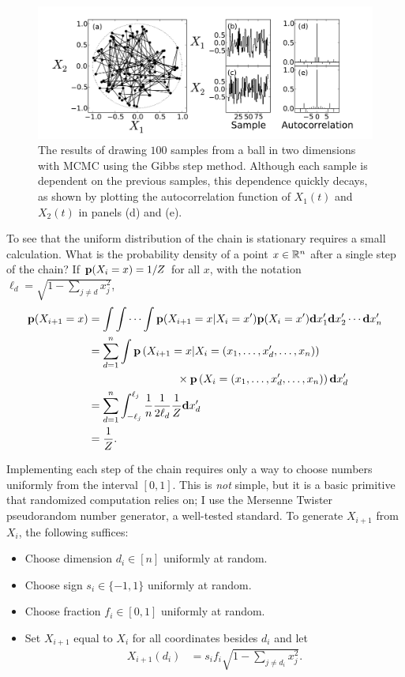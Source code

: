 \begin{figure}[ht]
\begin{center}
\includegraphics[width=\textwidth]{gibbs-ball.pdf}
\caption[The results of drawing $100$ samples from a ball in two
  dimensions with MCMC using the Gibbs step method.]{The 
  results of drawing $100$ samples from a ball in two
  dimensions with MCMC using the Gibbs step method.  Although each
  sample is dependent on the previous samples, this dependence quickly
  decays, as shown by plotting the autocorrelation function of
  $X_1(t)$ and $X_2(t)$ in panels (d) and (e).}
\label{gibbs-ball}
\end{center}
\end{figure}


To see that the uniform distribution of the chain is stationary
requires a small calculation.  What is the probability density of a
point $x \in \mathbb{R}^n$ after a single step of the chain?  If
$\mathbf{p}(X_i=x) = 1/Z$ for all $x$, with the notation
$\ell_d = \sqrt{1-\sum_{j \neq d} x_j^2}$,
\begin{align*}
\mathbf{p}(X_{i+1}=x) &= \int\int\cdots\int \mathbf{p}(X_{i+1}=x|X_i=x') \mathbf{p}(X_i=x')\mathbf{d} x'_1 \mathbf{d} x'_2 \cdots \mathbf{d} x'_n\\
&=\sum_{d=1}^n \int \mathbf{p}\left(X_{i+1}=x | X_i = (x_1, \ldots, x'_d, \ldots, x_n)\right)\\
&\qquad\qquad\qquad\qquad\times \mathbf{p}\left(X_i = (x_1, \ldots, x'_d, \ldots, x_n)\right)\mathbf{d} x'_d\\
&=\sum_{d=1}^n \int_{-\ell_j}^{\ell_j} \frac{1}{n} \frac{1}{2\ell_d} \frac{1}{Z} \mathbf{d} x'_d\\
&=\frac{1}{Z}.
\end{align*}

Implementing each step of the chain requires
only a way to choose numbers uniformly from the interval $[0,1]$.  This
is \emph{not} simple, but it is a basic primitive that randomized
computation relies on; I use the Mersenne Twister pseudorandom number
generator, a well-tested standard.\cite{matsumoto_mersenne_1998}
To generate $X_{i+1}$ from $X_i$, the following suffices:
\begin{itemize}
\item Choose dimension $d_i \in [n]$ uniformly at random.
\item Choose sign $s_i \in \{-1, 1\}$ uniformly at random.
\item Choose fraction $f_i \in [0,1]$ uniformly at random.
\item Set $X_{i+1}$ equal to $X_i$ for all coordinates besides $d_i$ and let
\begin{align*}
X_{i+1}(d_i) &= s_i f_i \sqrt{1 - \sum_{j\neq d_i} x_j^2}.
\end{align*}
\end{itemize}

